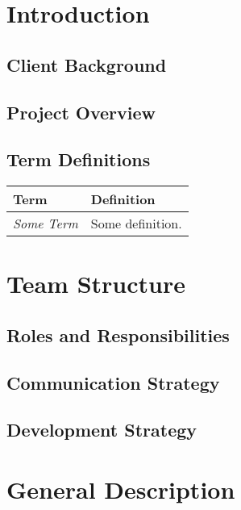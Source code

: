 \documentclass[11pt,a4paper]{article}
\begin{document}


\tableofcontents

\section{Introduction}

\subsection{Client Background}

\subsection{Project Overview}
\label{sec:project-overview}

\subsection{Term Definitions}
\label{sec:terms}

\begin{tabular}{|p{2.5cm}p{13cm}|}
\hline 
\textbf{Term} & \textbf{Definition} \\
\hline \hline
\emph{Some Term} & Some definition.\\
\hline
\end{tabular}

\newpage



\section{Team Structure}
\label{sec:team-structure}

\subsection{Roles and Responsibilities}
\subsection{Communication Strategy}
\subsection{Development Strategy}

\section{General Description}
\label{sec:gen-desc}
\end{document}
